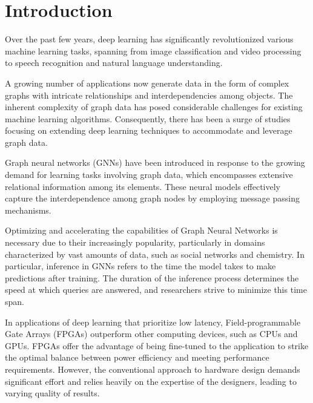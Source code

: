 \documentclass[11pt,a4paper,twocolumn]{article}
\begin{document}



\section{Introduction}
\label{sec:introduction}%

Over the past few years, deep learning has significantly revolutionized various machine learning tasks,
spanning from image classification and video processing to speech recognition and natural language understanding.

A growing number of applications now generate data in the form of complex graphs with intricate relationships and interdependencies among objects.
The inherent complexity of graph data has posed considerable challenges for existing machine learning algorithms.
Consequently, there has been a surge of studies focusing on extending deep learning techniques to accommodate
and leverage graph data.

Graph neural networks (GNNs) have been introduced in response to the growing demand for learning tasks involving
graph data, which encompasses extensive relational information among its elements.
These neural models effectively capture the interdependence among graph nodes by employing message passing mechanisms.

Optimizing and accelerating the capabilities of Graph Neural Networks is necessary due to their increasingly popularity, particularly in domains characterized by vast amounts of data,
such as social networks and chemistry.
In particular, inference in GNNs refers to the time the model takes to make predictions after training.
The duration of the inference process determines the speed at which queries are answered, and researchers strive to minimize this time span.

In applications of deep learning that prioritize low latency, Field-programmable Gate Arrays (FPGAs) outperform other computing devices, such as CPUs and GPUs.
FPGAs offer the advantage of being fine-tuned to the application to strike the optimal balance between power efficiency and meeting performance requirements.
However, the conventional approach to hardware design demands significant effort and relies heavily on the expertise of the designers, leading to varying quality of results.
\end{document}
